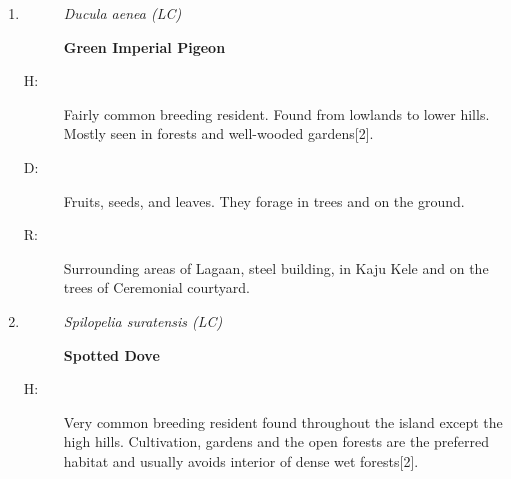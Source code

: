 \begin{itemize}
\begin{enumerate}
\begin{description}%
\item[]%
\textit{Columba livia (Feral)\footnote{The population of the Rock pigeon found throughout the country other than in the Pigeon Islands is a feral population and not considered as genetically pure.}}%
\item[]%
\textbf{Rock Pigeon}%
\end{description}%
\begin{description}%
\item[H: ]%
Wild populations occur rarely at large concrete dams while the largest may be in the pigeon island. Feral populations are the most common living in villages and towns{[}2{]}.%
\item[D: ]%
Mainly grains, seeds, plant seeds. They will also feast on berries, fruits and vegetables. Occasionally even will eat insects,snails and worms too.%
\item[R: ]%
Mostly observed in the library building. Uses broken ceilings as shelter there.%
\end{description}%
\item%
\begin{description}%
\item[]%
\textit{Ducula aenea (LC)}%
\item[]%
\textbf{Green Imperial Pigeon}%
\end{description}%
\begin{description}%
\item[H: ]%
Fairly common breeding resident. Found from lowlands to lower hills. Mostly seen in forests and well{-}wooded gardens{[}2{]}.%
\item[D: ]%
Fruits, seeds, and leaves. They forage in trees and on the ground.%
\item[R: ]%
Surrounding areas of Lagaan, steel building, in Kaju Kele and on the trees of Ceremonial courtyard.%
\end{description}%
\item%
\begin{description}%
\item[]%
\textit{Spilopelia suratensis (LC)}%
\item[]%
\textbf{Spotted Dove}%
\end{description}%
\begin{description}%
\item[H: ]%
Very common breeding resident found throughout the island except the high hills. Cultivation, gardens and the open forests are the preferred habitat and usually avoids interior of dense wet forests{[}2{]}.%

\end{description}
\end{enumerate}
\end{itemize}

